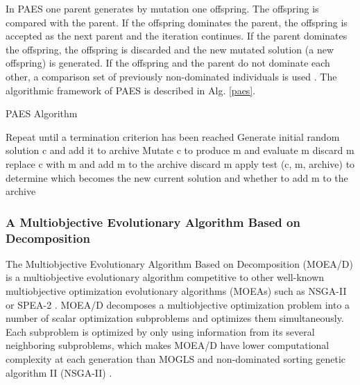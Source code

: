 \documentclass[espaco=umemeio,chapter=TITLE,twoside,openright]{abnt}
\begin{document}
In PAES one parent generates by mutation one
offspring. The offspring is compared with the parent. If the offspring dominates the parent, the offspring is accepted as
the next parent and the iteration continues. If the parent dominates the offspring, the offspring is discarded and the new mutated solution (a new offspring) is generated. If the offspring and the parent do not dominate each other, a comparison set of previously non-dominated individuals is used \cite{Knowles1999}\cite{Oltean2005}. The algorithmic framework of PAES is described in Alg. \ref{paes}.


\begin{algorithm}[h]
  \caption{PAES Algorithm \cite{Knowles1999}\cite{Oltean2005}}\label{paes}
  \begin{algorithmic}[1]
    \State Repeat until a termination criterion has been reached
    \State Generate initial random solution c and add it to archive
    \State Mutate c to produce m and evaluate m
    \State discard m
    \Else
     \State replace c with m and add m to the archive
    \Else
    \State discard m
    \Else
    \State apply test (c, m, archive) to determine which becomes the new current solution and whether to add m to the archive
    \EndIf
    \EndIf
    \EndIf
  \end{algorithmic}
\end{algorithm}

\subsubsection{A Multiobjective Evolutionary Algorithm Based on Decomposition}

The Multiobjective Evolutionary Algorithm Based on Decomposition (MOEA/D) is a multiobjective evolutionary algorithm competitive to other well-known multiobjective optimization evolutionary algorithms (MOEAs) such as NSGA-II or SPEA-2 \cite{Michalak2014}. MOEA/D decomposes a multiobjective optimization problem into a number of scalar optimization subproblems and optimizes them simultaneously. Each subproblem is optimized by only using information from its several neighboring subproblems, which makes MOEA/D have lower computational complexity at each generation than MOGLS and non-dominated sorting genetic
algorithm II (NSGA-II) \cite{Zhang2007}. 
\end{document}
